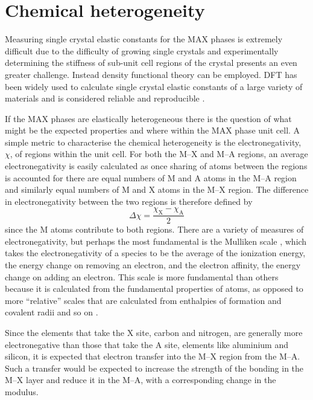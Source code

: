 \section{Chemical heterogeneity}

Measuring single crystal elastic constants for the MAX phases is extremely difficult due to the difficulty of growing single crystals and experimentally determining the stiffness of sub-unit cell regions of the crystal presents an even greater challenge. Instead density functional theory can be employed. DFT has been widely used to calculate single crystal elastic constants of a large variety of materials and is considered reliable and reproducible \cite{Lejaeghere2016}. 



If the MAX phases are elastically heterogeneous there is the question of what might be the expected properties and where within the MAX phase unit cell. A simple metric to characterise the chemical heterogeneity is the electronegativity, $\chi$, of regions within the unit cell. For both the M--X and M--A regions, an average electronegativity is easily calculated as once sharing of atoms between the regions is accounted for there are equal numbers of M and A atoms in the M--A region and similarly equal numbers of M and X atoms in the M--X region. The difference in electronegativity between the two regions is therefore defined by
\begin{equation}
\Delta \chi = \frac{\chi_{\text{X}} - \chi_{\text{A}}}{2}\label{eqn:MAX_electronegativity_diff}
\end{equation}
since the M atoms contribute to both regions. There are a variety of measures of electronegativity, but perhaps the most fundamental is the Mulliken scale \cite{Mulliken1934}, which takes the electronegativity of a species to be the average of the ionization energy, the energy change on removing an electron, and the electron affinity, the energy change on adding an electron. This scale is more fundamental than others because it is calculated from the fundamental properties of atoms, as opposed to more ``relative'' scales that are calculated from enthalpies of formation and covalent radii and so on \cite{huheey1983ch3_electronegativity}.

Since the elements that take the X site, carbon and nitrogen, are generally more electronegative than those that take the A site, elements like aluminium and silicon, it is expected that electron transfer into the M--X region from the M--A. Such a transfer would be expected to increase the strength of the bonding in the M--X layer and reduce it in the M--A, with a corresponding change in the modulus.


